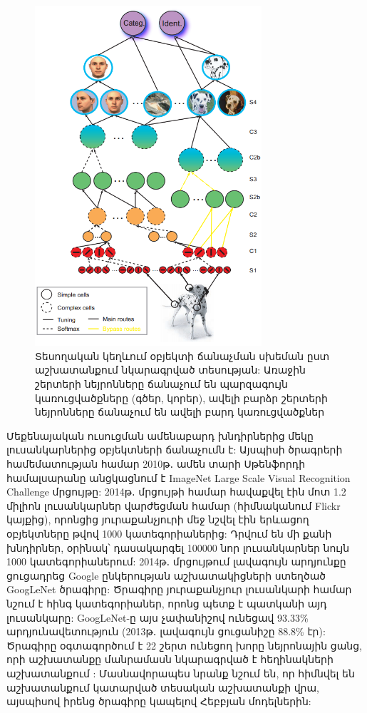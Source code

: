\documentclass[12pt,final]{amsproc}
\begin{document}
\begin{figure}[b!]
\centering
\includegraphics[width=0.75\textwidth]{serre2005.PNG}
\caption{Տեսողական կեղևում օբյեկտի ճանաչման սխեման ըստ \cite{Serre2005} աշխատանքում նկարագրված տեսության: Առաջին շերտերի նեյրոնները ճանաչում են պարզագույն կառուցվածքները (գծեր, կորեր), ավելի բարձր շերտերի նեյրոնները ճանաչում են ավելի բարդ կառուցվածքներ}
\label{Serre2005Fig}
\end{figure}

Մեքենայական ուսուցման ամենաբարդ խնդիրներից մեկը լուսանկարներից օբյեկտների ճանաչումն է: Այսպիսի ծրագրերի համեմատության համար 2010թ․ ամեն տարի Սթենֆորդի համալսարանը անցկացնում է ImageNet Large Scale Visual Recognition Challenge մրցույթը: 2014թ․ մրցույթի համար հավաքվել էին մոտ 1.2 միլիոն լուսանկարներ վարժեցման համար (հիմնականում Flickr կայքից), որոնցից յուրաքանչյուրի մեջ նշվել էին երևացող օբյեկտները թվով 1000 կատեգորիաներից: Դրվում են մի քանի խնդիրներ, օրինակ՝ դասակարգել 100000 նոր լուսանկարներ նույն 1000 կատեգորիաներում: 2014թ․ մրցույթում լավագույն արդյունքը ցուցադրեց Google ընկերության աշխատակիցների ստեղծած GoogLeNet ծրագիրը: Ծրագիրը յուրաքանչյուր լուսանկարի համար նշում է հինգ կատեգորիաներ, որոնց պետք է պատկանի այդ լուսանկարը: GoogLeNet-ը այս չափանիշով ունեցավ 93.33\% արդյունավետություն (2013թ․ լավագույն ցուցանիշը 88.8\% էր): Ծրագիրը օգտագործում է 22 շերտ ունեցող խորը նեյրոնային ցանց, որի աշխատանքը մանրամասն նկարագրված է հեղինակների աշխատանքում \cite{GoogLeNet2014}: Մասնավորապես նրանք նշում են, որ հիմնվել են \cite{Arora2013} աշխատանքում կատարված տեսական աշխատանքի վրա, այսպիսով իրենց ծրագիրը կապելով Հեբբյան մոդելներին:
\end{document}

